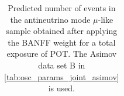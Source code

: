 \begin{table}
\begin{tabular} { | l ||r | r | r | r | r | r | | r | }
\end{tabular}
\caption{
Predicted number of events in the antineutrino mode $\mu$-like sample
obtained after applying the BANFF weight
for a total exposure of \TotalPotNuBarRunOneSevenC{} POT.
The Asimov data set B in \cref{tab:osc_params_joint_asimov} is used.
}
\label{tab:events_rhc1rmu_Asimov_B_Run17c}
\end{table}


